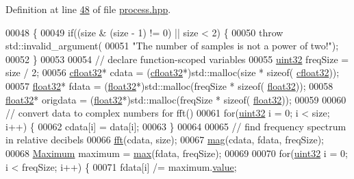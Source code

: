 Definition at line \hyperlink{process_8hpp_source_l00048}{48} of file \hyperlink{process_8hpp_source}{process.\+hpp}.


\begin{DoxyCode}
00048                                                                          \{
00049         \textcolor{keywordflow}{if}((size & (size - 1) != 0) || size < 2) \{
00050             \textcolor{keywordflow}{throw} std::invalid\_argument(
00051                     \textcolor{stringliteral}{"The number of samples is not a power of two!"});
00052         \}
00053 
00054         \textcolor{comment}{// declare function-scoped variables}
00055         \hyperlink{definitions_8hpp_a1134b580f8da4de94ca6b1de4d37975e}{uint32} freqSize = size / 2;
00056         \hyperlink{definitions_8hpp_a960be6b6614c08090c16574dba10a421}{cfloat32}* cdata = (\hyperlink{definitions_8hpp_a960be6b6614c08090c16574dba10a421}{cfloat32}*)std::malloc(size * \textcolor{keyword}{sizeof}(
      \hyperlink{definitions_8hpp_a960be6b6614c08090c16574dba10a421}{cfloat32}));
00057         \hyperlink{definitions_8hpp_aacdc525d6f7bddb3ae95d5c311bd06a1}{float32}* fdata = (\hyperlink{definitions_8hpp_aacdc525d6f7bddb3ae95d5c311bd06a1}{float32}*)std::malloc(freqSize * \textcolor{keyword}{sizeof}(
      \hyperlink{definitions_8hpp_aacdc525d6f7bddb3ae95d5c311bd06a1}{float32}));
00058         \hyperlink{definitions_8hpp_aacdc525d6f7bddb3ae95d5c311bd06a1}{float32}* origdata = (\hyperlink{definitions_8hpp_aacdc525d6f7bddb3ae95d5c311bd06a1}{float32}*)std::malloc(freqSize * \textcolor{keyword}{sizeof}(
      \hyperlink{definitions_8hpp_aacdc525d6f7bddb3ae95d5c311bd06a1}{float32}));
00059 
00060         \textcolor{comment}{// convert data to complex numbers for fft()}
00061         \textcolor{keywordflow}{for}(\hyperlink{definitions_8hpp_a1134b580f8da4de94ca6b1de4d37975e}{uint32} i = 0; i < size; i++) \{
00062             cdata[i] = data[i];
00063         \}
00064     
00065         \textcolor{comment}{// find frequency spectrum in relative decibels}
00066         \hyperlink{namespacevaso_af74f08a8afd7967b6c2b3c2b0e5fb1e9}{fft}(cdata, size);
00067         \hyperlink{namespacevaso_a5d355b5c326a852e2ce95c258450898c}{mag}(cdata, fdata, freqSize);
00068         \hyperlink{structMaximum}{Maximum} maximum = \hyperlink{namespacevaso_a122846d728be312454a452d379915e10}{max}(fdata, freqSize);
00069 
00070         \textcolor{keywordflow}{for}(\hyperlink{definitions_8hpp_a1134b580f8da4de94ca6b1de4d37975e}{uint32} i = 0; i < freqSize; i++) \{
00071             fdata[i] /= maximum.\hyperlink{structMaximum_aa7e84cbf37b694670142670014366969}{value};

\end{DoxyCode}
